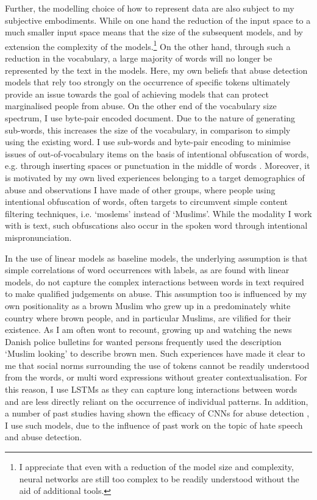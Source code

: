 Further, the modelling choice of how to represent data are also subject to my subjective embodiments. While on one hand the reduction of the input space to a much smaller input space means that the size of the subsequent models, and by extension the complexity of the models.\footnote{I appreciate that even with a reduction of the model size and complexity, neural networks are still too complex to be readily understood without the aid of additional tools.} On the other hand, through such a reduction in the vocabulary, a large majority of words will no longer be represented by the text in the models. Here, my own beliefs that abuse detection models that rely too strongly on the occurrence of specific tokens ultimately provide an issue towards the goal of achieving models that can protect marginalised people from abuse. On the other end of the vocabulary size spectrum, I use byte-pair encoded document. Due to the nature of generating sub-words, this increases the size of the vocabulary, in comparison to simply using the existing word. I use sub-words and byte-pair encoding to minimise issues of out-of-vocabulary items on the basis of intentional obfuscation of words, e.g. through inserting spaces or punctuation in the middle of words \citep{Rottger:2021}. Moreover, it is motivated by my own lived experiences belonging to a target demographics of abuse and observations I have made of other groups, where people using intentional obfuscation of words, often targets to circumvent simple content filtering techniques, i.e. `moslems' instead of `Muslims'. While the modality I work with is text, such obfuscations also occur in the spoken word through intentional mispronunciation.

In the use of linear models as baseline models, the underlying assumption is that simple correlations of word occurrences with labels, as are found with linear models, do not capture the complex interactions between words in text required to make qualified judgements on abuse. This assumption too is influenced by my own positionality as a brown Muslim who grew up in a predominately white country where brown people, and in particular Muslims, are vilified for their existence. As I am often wont to recount, growing up and watching the news Danish police bulletins for wanted persons frequently used the description `Muslim looking' to describe brown men. Such experiences have made it clear to me that social norms surrounding the use of tokens cannot be readily understood from the words, or multi word expressions without greater contextualisation. For this reason, I use LSTMs as they can capture long interactions between words and are less directly reliant on the occurrence of individual patterns. In addition, a number of past studies having shown the efficacy of CNNs for abuse detection \citep{Park:2017, Mitchell:2019,Kolhatkar:2020,Rizwan:2020,Safaya:2020,Gamback:2017}, I use such models, due to the influence of past work on the topic of hate speech and abuse detection.

